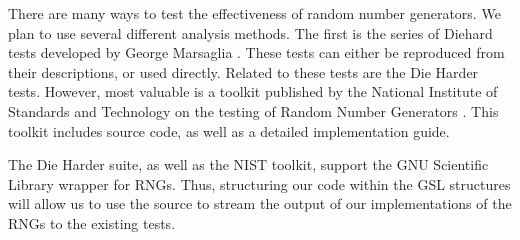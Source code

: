 There are many ways to test the effectiveness of random number generators. We plan to use several different analysis methods. The first is the series of Diehard tests developed by George Marsaglia \cite{diehard}. These tests can either be reproduced from their descriptions, or used directly. Related to these tests are the Die Harder tests. However, most valuable is a toolkit published by the National Institute of Standards and Technology on the testing of Random Number Generators \cite{nisttoolkit}. This toolkit includes source code, as well as a detailed implementation guide.

The Die Harder suite, as well as the NIST toolkit, support the GNU Scientific Library wrapper for RNGs. Thus, structuring our code within the GSL structures will allow us to use the source to stream the output of our implementations of the RNGs to the existing tests.
